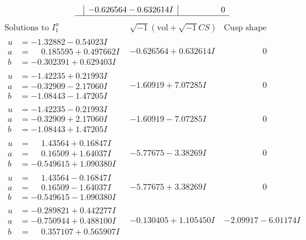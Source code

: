 \documentclass[1p]{elsarticle_modified}
\theoremstyle{definition}
\newcommand{\I}{\sqrt{-1}}
\begin{document}
$$\begin{array}{c|c|c}
 & -0.626564 - 0.632614 I & \phantom{-0.000000 } 0\\
 \hline 
 \end{array}$$\newpage$$\begin{array}{c|c|c}  
\text{Solutions to }I^u_{1}& \I (\text{vol} + \sqrt{-1}CS) & \text{Cusp shape}\\
 \hline 
\begin{aligned}
u &= -1.32882 - 0.54023 I \\
a &= \phantom{-}0.185595 + 0.497662 I \\
b &= -0.302391 + 0.629403 I\end{aligned}
 & -0.626564 + 0.632614 I & \phantom{-0.000000 } 0 \\ \hline\begin{aligned}
u &= -1.42235 + 0.21993 I \\
a &= -0.32909 - 2.17060 I \\
b &= -1.08443 - 1.47205 I\end{aligned}
 & -1.60919 + 7.07285 I & \phantom{-0.000000 } 0 \\ \hline\begin{aligned}
u &= -1.42235 - 0.21993 I \\
a &= -0.32909 + 2.17060 I \\
b &= -1.08443 + 1.47205 I\end{aligned}
 & -1.60919 - 7.07285 I & \phantom{-0.000000 } 0 \\ \hline\begin{aligned}
u &= \phantom{-}1.43564 + 0.16847 I \\
a &= \phantom{-}0.16509 + 1.64037 I \\
b &= -0.549615 + 1.090380 I\end{aligned}
 & -5.77675 - 3.38269 I & \phantom{-0.000000 } 0 \\ \hline\begin{aligned}
u &= \phantom{-}1.43564 - 0.16847 I \\
a &= \phantom{-}0.16509 - 1.64037 I \\
b &= -0.549615 - 1.090380 I\end{aligned}
 & -5.77675 + 3.38269 I & \phantom{-0.000000 } 0 \\ \hline\begin{aligned}
u &= -0.289821 + 0.442277 I \\
a &= -0.750944 + 0.488100 I \\
b &= \phantom{-}0.357107 + 0.565907 I\end{aligned}
 & -0.130405 + 1.105450 I & -2.09917 - 6.01174 I \\ \hline\begin{aligned}

\end{aligned}
\end{array}$$
\end{document}

